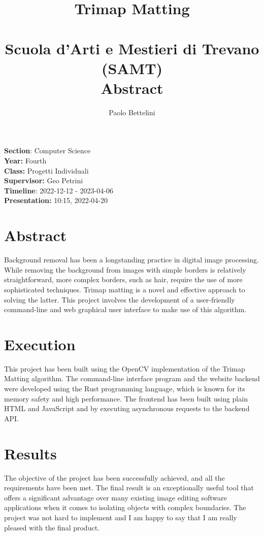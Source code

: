 \documentclass[a4paper]{article}
\title{%
    Trimap Matting \\
    \phantom{} \\
    \large Scuola d'Arti e Mestieri di Trevano (SAMT) \\
    \large Abstract
}
\author{Paolo Bettelini}
\date{}
\begin{document}
\maketitle

\vspace{2cm}

\textbf{Section}: Computer Science \\
\textbf{Year:} Fourth \\
\textbf{Class:} Progetti Individuali \\
\textbf{Supervisor:} Geo Petrini \\
\textbf{Timeline}: 2022-12-12 - 2023-04-06 \\
\textbf{Presentation:} 10:15, 2022-04-20

\vspace{2cm}

\thispagestyle{empty} %

\section*{Abstract}

Background removal has been a longstanding practice in digital image processing.
While removing the background from images with simple borders is relatively straightforward,
more complex borders, such as hair, require the use of more sophisticated techniques.
Trimap matting is a novel and effective approach to solving the latter.
This project involves the development of a user-friendly command-line and web graphical user interface
to make use of this algorithm.

\section*{Execution}

This project has been built using the OpenCV implementation of the Trimap Matting algorithm.
The command-line interface program and the website backend were developed using the Rust programming
language, which is known for its memory safety and high performance.
The frontend has been built using plain HTML and JavaScript and by
executing asynchronous requests to the backend API.

\section*{Results}

The objective of the project has been successfully achieved, and all the requirements have been met.
The final result is an exceptionally useful tool that offers a significant
advantage over many existing image editing software applications when it comes
to isolating objects with complex boundaries.
The project was not hard to implement and I am happy to say that
I am really pleased with the final product.
\end{document}
